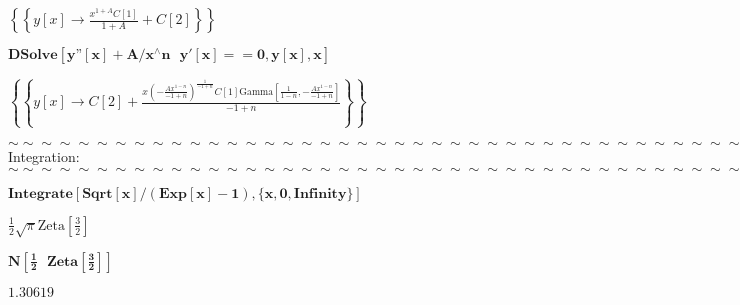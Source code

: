 \documentclass{article}
\begin{document}
\begin{doublespace}
\noindent\(\left\{\left\{y[x]\to \frac{x^{1+A} C[1]}{1+A}+C[2]\right\}\right\}\)
\end{doublespace}

\begin{doublespace}
\noindent\(\pmb{\text{DSolve}[y\text{''}[x]+A/x{}^{\wedge}n\text{  }y'[x]==0,y[x],x]}\)
\end{doublespace}

\begin{doublespace}
\noindent\(\left\{\left\{y[x]\to C[2]+\frac{x \left(-\frac{A x^{1-n}}{-1+n}\right)^{\frac{1}{-1+n}} C[1] \text{Gamma}\left[\frac{1}{1-n},-\frac{A
x^{1-n}}{-1+n}\right]}{-1+n}\right\}\right\}\)
\end{doublespace}

$\sim \sim \sim \sim \sim \sim \sim \sim \sim \sim \sim \sim \sim \sim \sim \sim \sim \sim \sim \sim \sim \sim \sim \sim \sim \sim \sim \sim \sim
\sim \sim \sim \sim \sim \sim \sim \sim \sim \sim \sim \sim $\\
Integration:\\
$\sim \sim \sim \sim \sim \sim \sim \sim \sim \sim \sim \sim \sim \sim \sim \sim \sim \sim \sim \sim \sim \sim \sim \sim \sim \sim \sim \sim \sim
\sim \sim \sim \sim \sim \sim \sim \sim \sim \sim \sim \sim $

\begin{doublespace}
\noindent\(\pmb{\text{Integrate}[\text{Sqrt}[x]/(\text{Exp}[x]-1),\{x,0,\text{Infinity}\}]}\)
\end{doublespace}

\begin{doublespace}
\noindent\(\frac{1}{2} \sqrt{\pi } \text{Zeta}\left[\frac{3}{2}\right]\)
\end{doublespace}

\begin{doublespace}
\noindent\(\pmb{N\left[\frac{1}{2}\text{  }\text{Zeta}\left[\frac{3}{2}\right]\right]}\)
\end{doublespace}

\begin{doublespace}
\noindent\(1.30619\)
\end{doublespace}
\end{document}
